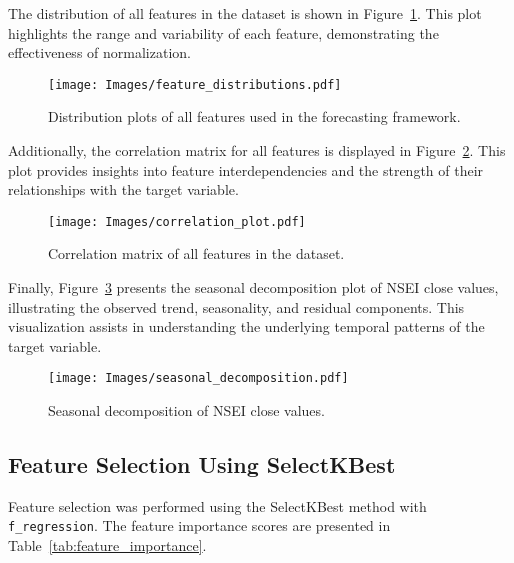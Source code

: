 The distribution of all features in the dataset is shown in Figure~\ref{fig:feature_distributions}. This plot highlights the range and variability of each feature, demonstrating the effectiveness of normalization.

\begin{figure}[h!]
    \centering
    \texttt{[image: Images/feature\_distributions.pdf]}
    \caption{Distribution plots of all features used in the forecasting framework.}
    \label{fig:feature_distributions}
\end{figure}

Additionally, the correlation matrix for all features is displayed in Figure~\ref{fig:correlation_plot}. This plot provides insights into feature interdependencies and the strength of their relationships with the target variable.

\begin{figure}[h!]
    \centering
    \texttt{[image: Images/correlation\_plot.pdf]}
    \caption{Correlation matrix of all features in the dataset.}
    \label{fig:correlation_plot}
\end{figure}

Finally, Figure~\ref{fig:seasonal_decomposition} presents the seasonal decomposition plot of NSEI close values, illustrating the observed trend, seasonality, and residual components. This visualization assists in understanding the underlying temporal patterns of the target variable.

\begin{figure}[h!]
    \centering
    \texttt{[image: Images/seasonal\_decomposition.pdf]}
    \caption{Seasonal decomposition of NSEI close values.}
    \label{fig:seasonal_decomposition}
\end{figure}

\subsection{Feature Selection Using SelectKBest}
Feature selection was performed using the SelectKBest method with \texttt{f\_regression}. The feature importance scores are presented in Table~\ref{tab:feature_importance}.

